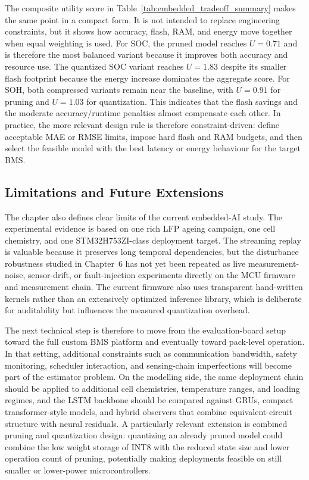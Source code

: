 \documentclass[
    a4paper,
    12pt,
    titlepage,
    bibliography=totoc,
    twoside=on,
    parskip=false,
    numbers=noenddot,
    cleardoublepage=empty,
    DIV=12,
    BCOR=12.0mm,
    headheight=36pt,
    headings=openright
]{scrreprt}
\begin{document}
The composite utility score in Table~\ref{tab:embedded_tradeoff_summary} makes the same point in a compact form. It is not intended to replace engineering constraints, but it shows how accuracy, flash, RAM, and energy move together when equal weighting is used. For SOC, the pruned model reaches $U=0.71$ and is therefore the most balanced variant because it improves both accuracy and resource use. The quantized SOC variant reaches $U=1.83$ despite its smaller flash footprint because the energy increase dominates the aggregate score. For SOH, both compressed variants remain near the baseline, with $U=0.91$ for pruning and $U=1.03$ for quantization. This indicates that the flash savings and the moderate accuracy/runtime penalties almost compensate each other. In practice, the more relevant design rule is therefore constraint-driven: define acceptable MAE or RMSE limits, impose hard flash and RAM budgets, and then select the feasible model with the best latency or energy behaviour for the target BMS.

\subsection{Limitations and Future Extensions}
The chapter also defines clear limits of the current embedded-AI study. The experimental evidence is based on one rich LFP ageing campaign, one cell chemistry, and one STM32H753ZI-class deployment target. The streaming replay is valuable because it preserves long temporal dependencies, but the disturbance robustness studied in Chapter~6 has not yet been repeated as live measurement-noise, sensor-drift, or fault-injection experiments directly on the MCU firmware and measurement chain. The current firmware also uses transparent hand-written kernels rather than an extensively optimized inference library, which is deliberate for auditability but influences the measured quantization overhead.

The next technical step is therefore to move from the evaluation-board setup toward the full custom BMS platform and eventually toward pack-level operation. In that setting, additional constraints such as communication bandwidth, safety monitoring, scheduler interaction, and sensing-chain imperfections will become part of the estimator problem. On the modelling side, the same deployment chain should be applied to additional cell chemistries, temperature ranges, and loading regimes, and the LSTM backbone should be compared against GRUs, compact transformer-style models, and hybrid observers that combine equivalent-circuit structure with neural residuals.\autocite{liptonCriticalReviewRecurrent2015,singhDeepMachineLearning2024,gaoEnhancedStateofchargeEstimation2022,wangFusionEstimationLithiumion2022} A particularly relevant extension is combined pruning and quantization design: quantizing an already pruned model could combine the low weight storage of INT8 with the reduced state size and lower operation count of pruning, potentially making deployments feasible on still smaller or lower-power microcontrollers.
\end{document}
